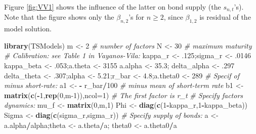 \documentclass[
  12pt,
]{book}
\newenvironment{Shaded}{\begin{snugshade}}{\end{snugshade}}
\newcommand{\AttributeTok}[1]{\textcolor[rgb]{0.13,0.29,0.53}{#1}}
\newcommand{\CommentTok}[1]{\textcolor[rgb]{0.56,0.35,0.01}{\textit{#1}}}
\newcommand{\DecValTok}[1]{\textcolor[rgb]{0.00,0.00,0.81}{#1}}
\newcommand{\FloatTok}[1]{\textcolor[rgb]{0.00,0.00,0.81}{#1}}
\newcommand{\FunctionTok}[1]{\textcolor[rgb]{0.13,0.29,0.53}{\textbf{#1}}}
\newcommand{\NormalTok}[1]{#1}
\newcommand{\OtherTok}[1]{\textcolor[rgb]{0.56,0.35,0.01}{#1}}
\newcommand{\SpecialCharTok}[1]{\textcolor[rgb]{0.81,0.36,0.00}{\textbf{#1}}}
\theoremstyle{definition}
\theoremstyle{definition}
\theoremstyle{definition}
\theoremstyle{definition}
\theoremstyle{remark}
\begin{document}
Figure \ref{fig:VV1} shows the influence of the latter on bond supply (the \(s_{n,t}\)'s). Note that the figure shows only the \(\beta_{n,2}\)'s for \(n \ge 2\), since \(\beta_{1,2}\) is residual of the model solution.

\begin{Shaded}
\begin{Highlighting}[]
\FunctionTok{library}\NormalTok{(TSModels)}
\NormalTok{m }\OtherTok{\textless{}{-}} \DecValTok{2} \CommentTok{\# number of factors}
\NormalTok{N }\OtherTok{\textless{}{-}} \DecValTok{30} \CommentTok{\# maximum maturity}
\CommentTok{\# Calibration: see Table 1 in Vayanos{-}Vila:}
\NormalTok{kappa\_r }\OtherTok{\textless{}{-}}\NormalTok{ .}\DecValTok{125}\NormalTok{;sigma\_r }\OtherTok{\textless{}{-}}\NormalTok{ .}\DecValTok{0146}
\NormalTok{kappa\_beta }\OtherTok{\textless{}{-}}\NormalTok{ .}\DecValTok{053}\NormalTok{;a.theta }\OtherTok{\textless{}{-}} \DecValTok{3155}
\NormalTok{a.alpha }\OtherTok{\textless{}{-}} \FloatTok{35.3}\NormalTok{; delta\_alpha }\OtherTok{\textless{}{-}}\NormalTok{ .}\DecValTok{297}
\NormalTok{delta\_theta }\OtherTok{\textless{}{-}}\NormalTok{ .}\DecValTok{307}\NormalTok{;alpha }\OtherTok{\textless{}{-}} \FloatTok{5.21}\NormalTok{;r\_bar }\OtherTok{\textless{}{-}} \FloatTok{4.8}\NormalTok{;a.theta0 }\OtherTok{\textless{}{-}} \DecValTok{289}
\CommentTok{\# Specif of minus short{-}rate:}
\NormalTok{a1 }\OtherTok{\textless{}{-}} \SpecialCharTok{{-}}\NormalTok{ r\_bar}\SpecialCharTok{/}\DecValTok{100} \CommentTok{\# minus mean of short{-}term rate}
\NormalTok{b1 }\OtherTok{\textless{}{-}} \FunctionTok{matrix}\NormalTok{(}\FunctionTok{c}\NormalTok{(}\SpecialCharTok{{-}}\DecValTok{1}\NormalTok{,}\FunctionTok{rep}\NormalTok{(}\DecValTok{0}\NormalTok{,m}\DecValTok{{-}1}\NormalTok{)),}\AttributeTok{ncol=}\DecValTok{1}\NormalTok{) }\CommentTok{\# The first factor is r\_t}
\CommentTok{\# Specify factors\textquotesingle{} dynamics:}
\NormalTok{mu\_f  }\OtherTok{\textless{}{-}} \FunctionTok{matrix}\NormalTok{(}\DecValTok{0}\NormalTok{,m,}\DecValTok{1}\NormalTok{)}
\NormalTok{Phi   }\OtherTok{\textless{}{-}} \FunctionTok{diag}\NormalTok{(}\FunctionTok{c}\NormalTok{(}\DecValTok{1}\SpecialCharTok{{-}}\NormalTok{kappa\_r,}\DecValTok{1}\SpecialCharTok{{-}}\NormalTok{kappa\_beta))}
\NormalTok{Sigma }\OtherTok{\textless{}{-}} \FunctionTok{diag}\NormalTok{(}\FunctionTok{c}\NormalTok{(sigma\_r,sigma\_r))}
\CommentTok{\# Specify supply of bonds:}
\NormalTok{a }\OtherTok{\textless{}{-}}\NormalTok{ a.alpha}\SpecialCharTok{/}\NormalTok{alpha;theta }\OtherTok{\textless{}{-}}\NormalTok{ a.theta}\SpecialCharTok{/}\NormalTok{a; theta0 }\OtherTok{\textless{}{-}}\NormalTok{ a.theta0}\SpecialCharTok{/}\NormalTok{a}

\end{Highlighting}
\end{Shaded}
\end{document}
